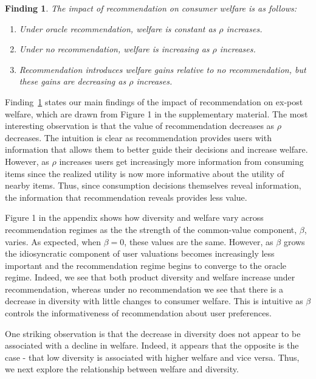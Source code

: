 \documentclass[format=acmsmall, review=false]{acmart}
\newtheorem{finding}{Finding}
\begin{document}
\begin{finding}\label{finding_welfare_gap}
The impact of recommendation on consumer welfare is as follows:
\begin{enumerate}
\item Under oracle recommendation, welfare is constant as $\rho$ increases.
\item Under no recommendation, welfare is increasing as $\rho$ increases.
\item Recommendation introduces welfare gains relative to no recommendation, but these gains are decreasing as $\rho$ increases. 
\end{enumerate}
\end{finding}
\par 
Finding~\ref{finding_welfare_gap} states our main findings of the impact of recommendation on ex-post welfare, which are drawn from Figure 1 in the supplementary material. The most interesting observation is that the value of recommendation decreases as $\rho$ decreases. The intuition is clear as recommendation provides users with information that allows them to better guide their decisions and increase welfare. However, as $\rho$ increases users get increasingly more information from consuming items since the realized utility is now more informative about the utility of nearby items. Thus, since consumption decisions themselves reveal information, the information that recommendation reveals provides less value.
\par 
Figure 1 in the appendix shows how diversity and welfare vary across recommendation regimes as the the strength of the common-value component, $\beta$, varies. As expected, when $\beta = 0$, these values are the same. However, as $\beta$ grows the idiosyncratic component of user valuations becomes increasingly less important and the recommendation regime begins to converge to the oracle regime. Indeed, we see that both product diversity and welfare increase under recommendation, whereas under no recommendation we see that there is a decrease in diversity with little changes to consumer welfare. This is intuitive as $\beta$ controls the informativeness of recommendation about user preferences.
\par 
One striking observation is that the decrease in diversity does not appear to be associated with a decline in welfare. Indeed, it appears that the opposite is the case - that low diversity is associated with higher welfare and vice versa. Thus, we next explore the relationship between welfare and diversity.
\end{document}

